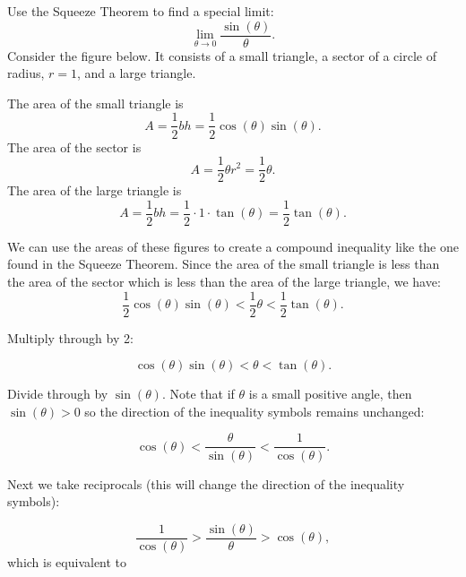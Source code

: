\documentclass[handout]{ximera}
\begin{document}
\begin{example}[example 3]
Use the Squeeze Theorem to find a special limit: 
\[
\lim_{\theta \to 0} \frac{\sin(\theta)}{\theta}.
\]
Consider the figure below.  It consists of a small triangle, a sector of a circle of radius,  $r = 1$, and a large triangle.

\begin{image}
\end{image}







The area of the small triangle is 
\[
A = \frac12 bh = \frac12 \cos(\theta) \sin(\theta).
\]
The area of the sector is 
\[
A = \frac12 \theta r^2 = \frac12 \theta.
\]
The area of the large triangle is 
\[
A = \frac12 bh = \frac12 \cdot 1 \cdot \tan(\theta) = \frac12 \tan(\theta).
\]

We can use the areas of these figures to create a compound inequality like the one found in the Squeeze Theorem.
Since the area of the small triangle is less than the area of the sector which is less than the area of the large triangle, we have:
\[
\frac12 \cos(\theta) \sin(\theta) < \frac12 \theta < \frac12 \tan(\theta).
\]

Multiply through by 2:

\[
\cos(\theta) \sin(\theta) < \theta < \tan(\theta).
\]

Divide through by $\sin(\theta)$.  Note that if $\theta$ is a small positive angle, then $\sin(\theta) >0$ so the direction of the inequality symbols remains unchanged:

\[
\cos(\theta)  < \frac{ \theta}{\sin(\theta)} < \frac{1}{\cos(\theta)}.
\]

Next we take reciprocals (this will change the direction of the inequality symbols):

\[
\frac{1}{\cos(\theta)}  > \frac{\sin(\theta)}{\theta} > \cos(\theta),
\]
which is equivalent to 


\end{example}
\end{document}
